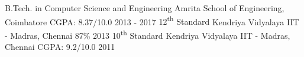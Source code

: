 \begin{cventries}
  \cventry
    {B.Tech. in Computer Science and Engineering}
    {Amrita School of Engineering, Coimbatore}
    {CGPA: 8.37/10.0}
    {2013 - 2017}
    {\empty}
  \cventry
    {12\textsuperscript{th} Standard}
    {Kendriya Vidyalaya IIT - Madras, Chennai}
    {87\%}
    {2013}
    {\empty}
  \cventry
    {10\textsuperscript{th} Standard}
    {Kendriya Vidyalaya IIT - Madras, Chennai}
    {CGPA: 9.2/10.0}
    {2011}
    {\empty}
\end{cventries}
